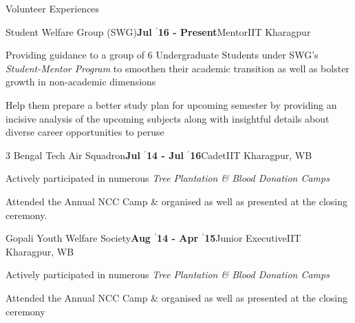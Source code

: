 \documentclass{resume} %
\begin{document}
\begin{rSection}{Volunteer Experiences}

\begin{rSubsection}{\large Student Welfare Group (SWG)}{\textbf{\large Jul $^{\prime}$16 - Present}}{Mentor}{IIT Kharagpur}
\item Providing guidance to a group of 6 Undergraduate Students under SWG's \textit{Student-Mentor Program} to smoothen their academic transition as well as bolster growth in non-academic dimensions
\item Help them prepare a better study plan for upcoming semester by providing an incisive analysis of the upcoming subjects along with insightful details about diverse career opportunities to peruse
\end{rSubsection}

\begin{rSubsection}{\large 3 Bengal Tech Air Squadron}{\textbf{\large Jul $^{\prime}$14 - Jul $^{\prime}$16}}{Cadet}{IIT Kharagpur, WB}
\item Actively participated in numerous \textit{Tree Plantation \& Blood Donation Camps}
\item Attended the Annual NCC Camp \& organised as well as presented at the closing ceremony.
\end{rSubsection}


\begin{rSubsection}{\large Gopali Youth Welfare Society}{\textbf{\large Aug $^{\prime}$14 - Apr $^{\prime}$15}}{Junior Executive}{IIT Kharagpur, WB}
\item Actively participated in numerous \textit{Tree Plantation \& Blood Donation Camps}
\item Attended the Annual NCC Camp \& organised as well as presented at the closing ceremony
\end{rSubsection}

\end{rSection}

\end{document}
